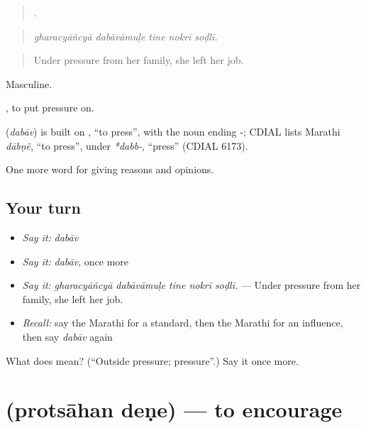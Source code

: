 \begin{quote}
    .
\end{quote}

\begin{quote}
\emph{gharacyāñcyā dabāvāmuḷe tine nokrī soḍlī.}
\end{quote}

\begin{quote}
Under pressure from her family, she left her job.
\end{quote}

Masculine.

 , to put pressure on.

\begin{cousinweb}
\textbf{} (\emph{dabāv}) is built on , \textquotedblleft{}to press\textquotedblright{}, with the noun ending -; CDIAL lists Marathi \emph{dābṇẽ}, \textquotedblleft{}to press\textquotedblright{}, under \emph{*dabb-}, \textquotedblleft{}press\textquotedblright{} (CDIAL 6173).
\end{cousinweb}

\begin{grammarlens}[title={What you've built}]
One more word for giving reasons and opinions.
\end{grammarlens}

\subsection*{Your turn}
\begin{itemize}
\raggedright
  \item \emph{Say it:} \emph{dabāv}
  \item \emph{Say it:} \emph{dabāv}, once more
  \item \emph{Say it:} \emph{gharacyāñcyā dabāvāmuḷe tine nokrī soḍlī.} — Under pressure from her family, she left her job.
  \item \emph{Recall:} say the Marathi for a standard, then the Marathi for an influence, then say \emph{dabāv} again
\end{itemize}

\begin{tcolorbox}[breakable,colback=teal!4,colframe=teal!35!black,title={Before you move on}]
What does  mean? (\textquotedblleft{}Outside pressure; pressure\textquotedblright{}.) Say it once more.
\end{tcolorbox}
\section[\texorpdfstring{\mr{प्रोत्साहन} \mr{देणे} (protsāhan deṇe)}{प्रोत्साहन देणे (protsāhan deṇe)}]{  (protsāhan deṇe) — to encourage}

